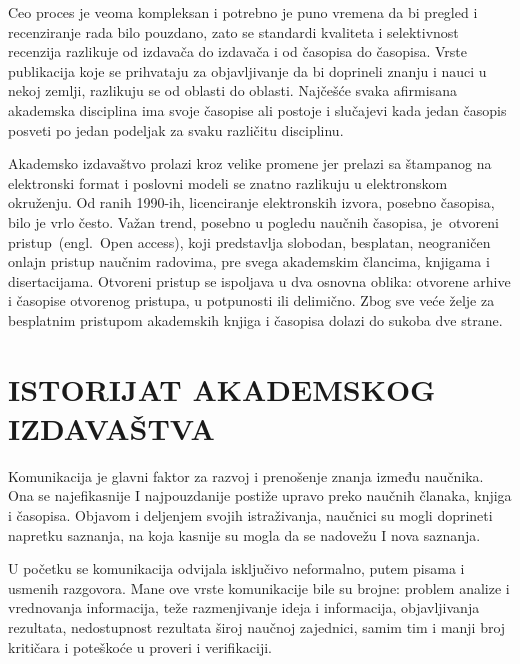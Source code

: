 \documentclass[12pt,a4paper]{article}
\begin{document}
   Ceo proces je veoma kompleksan i potrebno je puno vremena da bi pregled i recenziranje rada bilo pouzdano, zato se standardi kvaliteta i selektivnost recenzija razlikuje od izdavača do izdavača i od časopisa do časopisa. Vrste publikacija koje se prihvataju za objavljivanje da bi doprineli znanju i nauci u nekoj zemlji, razlikuju se od oblasti do oblasti. Najčešće svaka afirmisana akademska disciplina ima svoje časopise ali postoje i slučajevi kada jedan časopis posveti po jedan podeljak za svaku različitu disciplinu.
   
   Akademsko izdavaštvo prolazi kroz velike promene jer prelazi sa štampanog na elektronski format i poslovni modeli se znatno razlikuju u elektronskom okruženju. Od ranih 1990-ih, licenciranje elektronskih izvora, posebno časopisa, bilo je vrlo često. Važan trend, posebno u pogledu naučnih časopisa, je otvoreni pristup (engl. Open access), koji predstavlja slobodan, besplatan, neograničen onlajn pristup naučnim radovima, pre svega akademskim člancima, knjigama i disertacijama. Otvoreni pristup se ispoljava u dva osnovna oblika: otvorene arhive i časopise otvorenog pristupa, u potpunosti ili delimično. Zbog sve veće želje za besplatnim pristupom akademskih knjiga i časopisa dolazi do sukoba dve strane. 



\section{\large\textbf{ISTORIJAT AKADEMSKOG IZDAVAŠTVA}}

\indent 

    Komunikacija je glavni faktor za razvoj i prenošenje znanja između naučnika. Ona se najefikasnije I najpouzdanije postiže upravo preko naučnih članaka, knjiga i časopisa. Objavom i deljenjem svojih istraživanja, naučnici su mogli doprineti napretku saznanja, na koja kasnije su mogla da se nadovežu I nova saznanja.
  
   U početku se komunikacija odvijala isključivo neformalno, putem pisama i usmenih razgovora. Mane ove vrste komunikacije bile su brojne: problem analize i vrednovanja informacija, teže razmenjivanje ideja i informacija, objavljivanja rezultata, nedostupnost rezultata široj naučnoj zajednici, samim tim i manji broj kritičara i poteškoće u proveri i verifikaciji.
   
\end{document}
